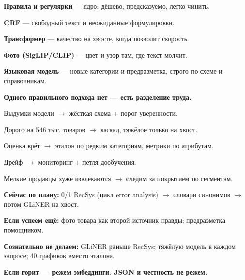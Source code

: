 \documentclass[11pt,a4paper]{article}
\begin{document}
\begin{landscape}
\begin{tcbraster}[raster columns=3, raster column skip=4pt, raster equal height,
  enhanced, colframe=rulec, boxrule=0.6pt, arc=1.5pt,
  left=5pt, right=5pt, top=3pt, bottom=3pt, colback=white]

\begin{tcolorbox}[colbacktitle=slate, title={\scriptsize\bfseries ГИБРИД ПОДХОДОВ --- КТО ЗА ЧТО}]
\tiny
\textbf{Правила и регулярки} --- ядро: дёшево, предсказуемо, легко чинить.\par\vspace{1.5pt}
\textbf{CRF} --- свободный текст и неожиданные формулировки.\par\vspace{1.5pt}
\textbf{Трансформер} --- качество на хвосте, когда позволит скорость.\par\vspace{1.5pt}
\textbf{Фото (SigLIP/CLIP)} --- цвет и узор там, где текст молчит.\par\vspace{1.5pt}
\textbf{Языковая модель} --- новые категории и предразметка, строго по схеме и справочникам.\par\vspace{2pt}
{\color{mvred}\bfseries Одного правильного подхода нет --- есть разделение труда.}
\end{tcolorbox}%
\begin{tcolorbox}[colbacktitle=slate, title={\scriptsize\bfseries РИСКИ И ЛЕКАРСТВА}]
\tiny
Выдумки модели $\to$ жёсткая схема + порог уверенности.\par\vspace{1.5pt}
Дорого на 546 тыс. товаров $\to$ каскад, тяжёлое только на хвост.\par\vspace{1.5pt}
Оценка врёт $\to$ эталон по редким категориям, метрики по атрибутам.\par\vspace{1.5pt}
Дрейф $\to$ мониторинг + петля дообучения.\par\vspace{1.5pt}
Мелкие продавцы хуже извлекаются $\to$ следим за покрытием по сегментам.
\end{tcolorbox}%
\begin{tcolorbox}[colbacktitle=slate, title={\scriptsize\bfseries РАСТЯЖКИ И ГРАНИЦЫ}]
\tiny
\textbf{Сейчас по плану:} 0/1 RecSys (цикл error analysis) $\to$ словари синонимов $\to$ потом GLiNER на хвост.\par\vspace{1.5pt}
\textbf{Если успеем ещё:} фото товара как второй источник правды; предразметка помощником.\par\vspace{1.5pt}
\textbf{Сознательно не делаем:} GLiNER раньше RecSys; тяжёлую модель в каждом запросе; 40 графиков вместо эталона.\par\vspace{2pt}
{\color{mint}\bfseries Если горит --- режем эмбеддинги. JSON и честность не режем.}
\end{tcolorbox}%
\end{tcbraster}


\end{landscape}
\end{document}
